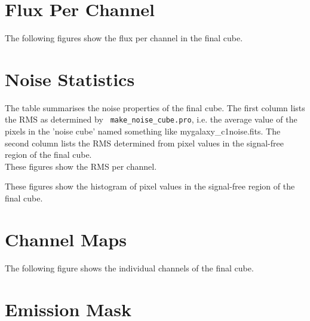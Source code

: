 \documentclass[11pt]{article}
\begin{document}
\section{Flux Per Channel}
\label{sect:perchannel}
%

\noindent The following figures show the flux per channel in the final cube.



\section{Noise Statistics}
\label{sec:noise_stats}

\noindent The table summarises the noise properties of the final
cube. The first column lists the RMS as determined by {\tt
  make\_noise\_cube.pro}, i.e. the average value of the pixels in the
'noise cube' named something like mygalaxy\_c1noise.fits. The second
column lists the RMS determined from pixel values in the 
signal-free region of the final cube. \\



\noindent These figures show the RMS per channel.



\noindent These figures show the histogram of pixel values in the
 signal-free region of the final cube.



\section{Channel Maps}
\label{sect:channel_maps}

\noindent The following figure shows the individual channels of the final cube.\\


%

%

%

\section{Emission Mask}
\label{sect:emission_mask}
\end{document}
